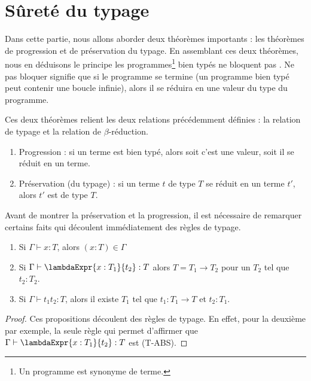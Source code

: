 \section{Sûreté du typage}

Dans cette partie, nous allons aborder deux théorèmes importants : les
théorèmes de progression et de préservation du typage. En assemblant ces deux
théorèmes, nous en déduisons le principe \og les
programmes\footnote{Un programme est synonyme de terme.}
bien typés ne bloquent pas \fg. Ne pas bloquer signifie que si le programme se
termine (un programme bien typé peut contenir une boucle infinie), alors il
se réduira en une valeur du type du programme.

Ces deux théorèmes relient les deux relations précédemment définies : la
relation de typage et la relation de $\beta$-réduction.

\begin{enumerate}
  \item Progression : si un terme est bien typé, alors soit c'est une
    valeur, soit il se réduit en un terme.
    \item Préservation (du typage) : si un terme $t$ de type $T$ se réduit en un terme $t'$,
      alors $t'$ est de type $T$.
\end{enumerate}

Avant de montrer la préservation et la progression, il est nécessaire de
remarquer certains faits qui découlent immédiatement des règles de typage.

\begin{lemma} 
  \label{lemma:simply-typed-lambda-calculus-inversion}
  \begin{enumerate}
    \item Si $\Gamma \vdash x : T$, alors $(x : T) \in \Gamma$
    \item Si $\Gamma \vdash \lambdaExpr{x : T_{1}}{t_{2}} : T$ alors $T = T_{1}
      \rightarrow T_{2}$ pour un $T_{2}$ tel que $t_{2} : T_{2}$.
    \item Si $\Gamma \vdash t_{1} t_{2} : T$, alors il existe $T_{1}$
      tel que $t_{1} : T_{1} \rightarrow T$ et $t_{2} : T_{1}$.
  \end{enumerate}
\end{lemma}

\begin{proof}
  \label{proof:simply-typed-lambda-calculus-inversion}
  Ces propositions découlent des règles de typage. En effet, pour la deuxième
  par exemple, la seule règle qui permet d'affirmer que $\Gamma \vdash
  \lambdaExpr{x : T_{1}}{t_{2}} : T$ est (T-ABS).
\end{proof}

